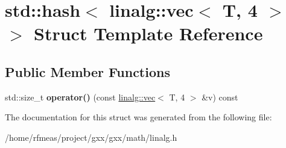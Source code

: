 \hypertarget{structstd_1_1hash_3_01linalg_1_1vec_3_01T_00_014_01_4_01_4}{}\section{std\+:\+:hash$<$ linalg\+:\+:vec$<$ T, 4 $>$ $>$ Struct Template Reference}
\label{structstd_1_1hash_3_01linalg_1_1vec_3_01T_00_014_01_4_01_4}
\subsection*{Public Member Functions}
\begin{DoxyCompactItemize}
\item 
std\+::size\+\_\+t {\bfseries operator()} (const \hyperlink{structlinalg_1_1vec}{linalg\+::vec}$<$ T, 4 $>$ \&v) const \hypertarget{structstd_1_1hash_3_01linalg_1_1vec_3_01T_00_014_01_4_01_4_a1a3fd5eac047ed4c36b1f4587c8d5a8a}{}\label{structstd_1_1hash_3_01linalg_1_1vec_3_01T_00_014_01_4_01_4_a1a3fd5eac047ed4c36b1f4587c8d5a8a}

\end{DoxyCompactItemize}


The documentation for this struct was generated from the following file\+:\begin{DoxyCompactItemize}
\item 
/home/rfmeas/project/gxx/gxx/math/linalg.\+h\end{DoxyCompactItemize}
